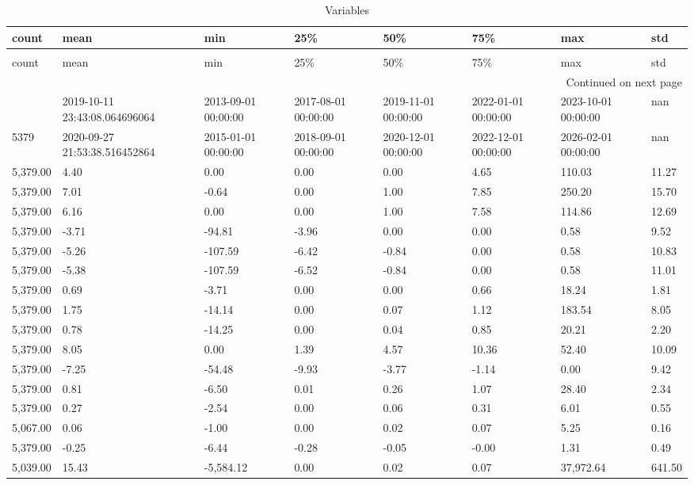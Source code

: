 \begin{longtable}{llllllll}
\caption{Variables} \label{eda_1} \\
\toprule
count & mean & min & 25\% & 50\% & 75\% & max & std \\
\midrule
\endfirsthead
\caption[]{Variables} \\
\toprule
count & mean & min & 25\% & 50\% & 75\% & max & std \\
\midrule
\endhead
\midrule
\multicolumn{8}{r}{Continued on next page} \\
\midrule
\endfoot
\bottomrule
\endlastfoot
5379 & 2019-10-11 23:43:08.064696064 & 2013-09-01 00:00:00 & 2017-08-01 00:00:00 & 2019-11-01 00:00:00 & 2022-01-01 00:00:00 & 2023-10-01 00:00:00 & nan \\
5379 & 2020-09-27 21:53:38.516452864 & 2015-01-01 00:00:00 & 2018-09-01 00:00:00 & 2020-12-01 00:00:00 & 2022-12-01 00:00:00 & 2026-02-01 00:00:00 & nan \\
5,379.00 & 4.40 & 0.00 & 0.00 & 0.00 & 4.65 & 110.03 & 11.27 \\
5,379.00 & 7.01 & -0.64 & 0.00 & 1.00 & 7.85 & 250.20 & 15.70 \\
5,379.00 & 6.16 & 0.00 & 0.00 & 1.00 & 7.58 & 114.86 & 12.69 \\
5,379.00 & -3.71 & -94.81 & -3.96 & 0.00 & 0.00 & 0.58 & 9.52 \\
5,379.00 & -5.26 & -107.59 & -6.42 & -0.84 & 0.00 & 0.58 & 10.83 \\
5,379.00 & -5.38 & -107.59 & -6.52 & -0.84 & 0.00 & 0.58 & 11.01 \\
5,379.00 & 0.69 & -3.71 & 0.00 & 0.00 & 0.66 & 18.24 & 1.81 \\
5,379.00 & 1.75 & -14.14 & 0.00 & 0.07 & 1.12 & 183.54 & 8.05 \\
5,379.00 & 0.78 & -14.25 & 0.00 & 0.04 & 0.85 & 20.21 & 2.20 \\
5,379.00 & 8.05 & 0.00 & 1.39 & 4.57 & 10.36 & 52.40 & 10.09 \\
5,379.00 & -7.25 & -54.48 & -9.93 & -3.77 & -1.14 & 0.00 & 9.42 \\
5,379.00 & 0.81 & -6.50 & 0.01 & 0.26 & 1.07 & 28.40 & 2.34 \\
5,379.00 & 0.27 & -2.54 & 0.00 & 0.06 & 0.31 & 6.01 & 0.55 \\
5,067.00 & 0.06 & -1.00 & 0.00 & 0.02 & 0.07 & 5.25 & 0.16 \\
5,379.00 & -0.25 & -6.44 & -0.28 & -0.05 & -0.00 & 1.31 & 0.49 \\
5,039.00 & 15.43 & -5,584.12 & 0.00 & 0.02 & 0.07 & 37,972.64 & 641.50 \\

\end{longtable}
